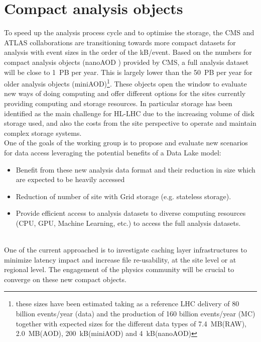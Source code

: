 \section{Compact analysis objects}
To speed up the analysis process cycle and to optimise the storage, the CMS and ATLAS collaborations are transitioning towards more compact datasets for analysis with event sizes in the order of the kB/event. Based on the numbers for compact analysis objects (nanoAOD \cite{nano}) provided by CMS, a full analysis dataset will be close to 1~PB per year. This is largely lower than the 50~PB per year for older analysis objects (miniAOD)\footnote{ these sizes have been estimated taking as a reference LHC delivery of 80 billion events/year (data) and the production of 160 billion events/year (MC) together with expected sizes for the different data types of 7.4~MB(RAW), 2.0~MB(AOD), 200~kB(miniAOD) and 4~kB(nanoAOD)}. These objects open the window to evaluate new ways of doing computing and offer different options for the sites currently providing computing and storage resources. In particular storage has been identified as the main challenge for HL-LHC due to the increasing volume of disk storage used, and also the costs from the site perspective to operate and maintain complex storage systems.\\
One of the goals of the working group is to propose and evaluate new scenarios for data access leveraging the potential benefits of a Data Lake model:
\begin{itemize}
\item Benefit from these new analysis data format and their reduction in size which are expected to be heavily accessed 
\item Reduction of number of site with Grid storage (e.g. stateless storage).
\item Provide efficient access to analysis datasets to diverse computing resources  (CPU, GPU, Machine Learning, etc.) to access the full analysis datasets.
\end{itemize}\\
One of the current approached is to investigate caching layer infrastructures to minimize latency impact and increase file re-usability, at the site level or at regional level.
The engagement of the physics community will be crucial to converge on these new compact objects. %

